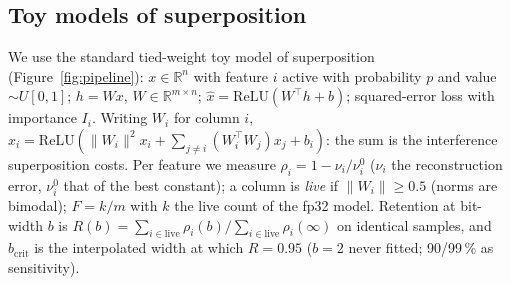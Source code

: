 \documentclass{article}
\begin{document}
\subsection{Toy models of superposition}
We use the standard tied-weight toy model of superposition~\cite{elhage2022toy} (Figure~\ref{fig:pipeline}): $x\in\mathbb{R}^n$ with feature $i$ active
with probability $p$ and value $\sim U[0,1]$; $h=Wx$, $W\in\mathbb{R}^{m\times n}$; $\hat x=\mathrm{ReLU}(W^\top h+b)$;
squared-error loss with importance $I_i$. Writing $W_i$ for column $i$, $\hat x_i = \mathrm{ReLU}(\lVert W_i\rVert^2x_i +
\sum_{j\neq i}(W_i^\top W_j)x_j + b_i)$: the sum is the interference superposition costs. Per feature we measure
$\rho_i = 1-\nu_i/\nu_i^0$ ($\nu_i$ the reconstruction error, $\nu_i^0$ that of the best constant); a column is \emph{live}
if $\lVert W_i\rVert\ge0.5$ (norms are bimodal); $F = k/m$ with $k$ the live count of the fp32 model. Retention at
bit-width $b$ is $R(b) = \sum_{i\in\mathrm{live}}\rho_i(b)/\sum_{i\in\mathrm{live}}\rho_i(\infty)$ on identical samples,
and $b_{\mathrm{crit}}$ is the interpolated width at which $R = 0.95$ ($b=2$ never fitted; 90/99\,\% as sensitivity).
\end{document}
